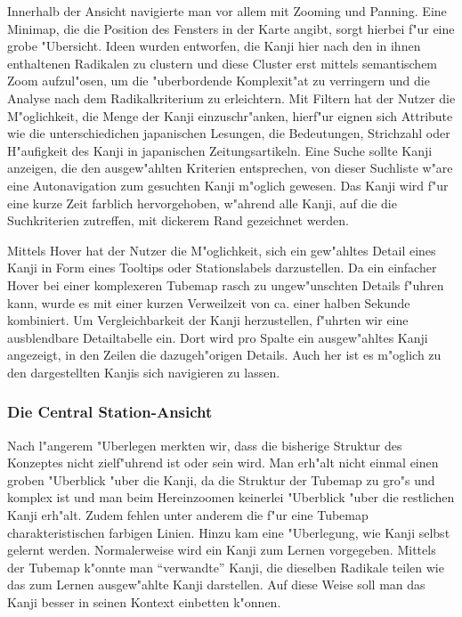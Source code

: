Innerhalb der Ansicht navigierte man vor allem mit Zooming und Panning. Eine Minimap, die die Position des Fensters in der Karte angibt, sorgt hierbei f"ur eine grobe "Ubersicht. Ideen wurden entworfen, die Kanji hier nach den in ihnen enthaltenen Radikalen zu clustern und diese Cluster erst mittels semantischem Zoom aufzul"osen, um die "uberbordende Komplexit"at zu verringern und die Analyse nach dem Radikalkriterium zu erleichtern. Mit Filtern hat der Nutzer die M"oglichkeit, die Menge der Kanji einzuschr"anken, hierf"ur eignen sich Attribute wie die unterschiedichen japanischen Lesungen, die Bedeutungen, Strichzahl oder H"aufigkeit des Kanji in japanischen Zeitungsartikeln. Eine Suche sollte Kanji anzeigen, die den ausgew"ahlten Kriterien entsprechen, von dieser Suchliste w"are eine Autonavigation zum gesuchten Kanji m"oglich gewesen. Das Kanji wird f"ur eine kurze Zeit farblich hervorgehoben, w"ahrend alle Kanji, auf die die Suchkriterien zutreffen, mit dickerem Rand gezeichnet werden.

Mittels Hover hat der Nutzer die M"oglichkeit, sich ein gew"ahltes Detail eines Kanji in Form eines Tooltips oder Stationslabels darzustellen. Da ein einfacher Hover bei einer komplexeren Tubemap rasch zu ungew"unschten Details f"uhren kann, wurde es mit einer kurzen Verweilzeit von ca. einer halben Sekunde kombiniert. Um Vergleichbarkeit der Kanji herzustellen, f"uhrten wir eine ausblendbare Detailtabelle ein. Dort wird pro Spalte ein ausgew"ahltes Kanji angezeigt, in den Zeilen die dazugeh"origen Details. Auch her ist es m"oglich zu den dargestellten Kanjis sich navigieren zu lassen.


\subsubsection{Die Central Station-Ansicht}
Nach l"angerem "Uberlegen merkten wir, dass die bisherige Struktur des Konzeptes nicht zielf"uhrend ist oder sein wird. Man erh"alt nicht einmal einen groben "Uberblick "uber die Kanji, da die Struktur der Tubemap zu gro"s und komplex ist und man beim Hereinzoomen keinerlei "Uberblick "uber die restlichen Kanji erh"alt. Zudem fehlen unter anderem die f"ur eine Tubemap charakteristischen farbigen Linien. Hinzu kam eine "Uberlegung, wie Kanji selbst gelernt werden. Normalerweise wird ein Kanji zum Lernen vorgegeben. Mittels der Tubemap k"onnte man "`verwandte"' Kanji, die dieselben Radikale teilen wie das zum Lernen ausgew"ahlte Kanji darstellen. Auf diese Weise soll man das Kanji besser in seinen Kontext einbetten k"onnen.

